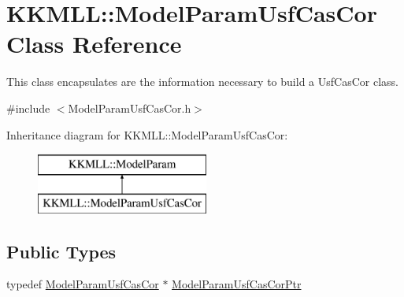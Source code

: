 \hypertarget{class_k_k_m_l_l_1_1_model_param_usf_cas_cor}{}\section{K\+K\+M\+LL\+:\+:Model\+Param\+Usf\+Cas\+Cor Class Reference}
\label{class_k_k_m_l_l_1_1_model_param_usf_cas_cor}


This class encapsulates are the information necessary to build a Usf\+Cas\+Cor class.  




{\ttfamily \#include $<$Model\+Param\+Usf\+Cas\+Cor.\+h$>$}

Inheritance diagram for K\+K\+M\+LL\+:\+:Model\+Param\+Usf\+Cas\+Cor\+:\begin{figure}[H]
\begin{center}
\leavevmode
\includegraphics[height=2.000000cm]{class_k_k_m_l_l_1_1_model_param_usf_cas_cor}
\end{center}
\end{figure}
\subsection*{Public Types}
\begin{DoxyCompactItemize}
\item 
typedef \hyperlink{class_k_k_m_l_l_1_1_model_param_usf_cas_cor}{Model\+Param\+Usf\+Cas\+Cor} $\ast$ \hyperlink{class_k_k_m_l_l_1_1_model_param_usf_cas_cor_a0f72ca8339557710b72336348855b34d}{Model\+Param\+Usf\+Cas\+Cor\+Ptr}
\end{DoxyCompactItemize}
